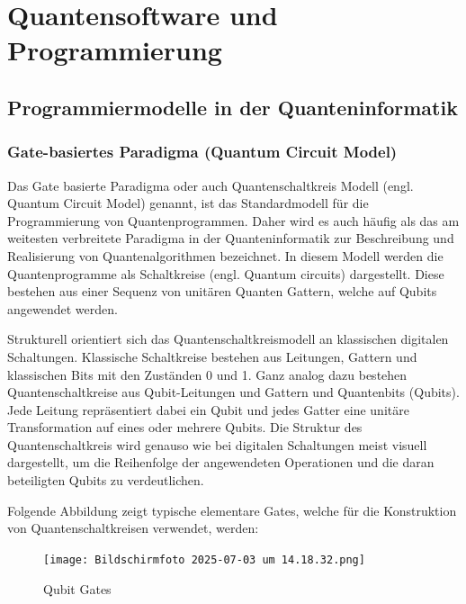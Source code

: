 \chapter{Quantensoftware und Programmierung}
\label{programming} %



\section{Programmiermodelle in der Quanteninformatik}

\subsection{Gate-basiertes Paradigma (Quantum Circuit Model)}
Das Gate basierte Paradigma oder auch Quantenschaltkreis Modell (engl. Quantum Circuit Model) genannt, ist das Standardmodell für die Programmierung von Quantenprogrammen. Daher wird es auch häufig als das am weitesten verbreitete Paradigma in der Quanteninformatik zur Beschreibung und Realisierung von Quantenalgorithmen bezeichnet. In diesem Modell werden die Quantenprogramme als Schaltkreise (engl. Quantum circuits) dargestellt. Diese bestehen aus einer Sequenz von unitären Quanten Gattern, welche auf Qubits angewendet werden. 

Strukturell orientiert sich das Quantenschaltkreismodell an klassischen digitalen Schaltungen. Klassische Schaltkreise bestehen aus Leitungen, Gattern und klassischen Bits mit den Zuständen 0 und 1. Ganz analog dazu bestehen Quantenschaltkreise aus Qubit-Leitungen und Gattern und Quantenbits (Qubits). Jede Leitung repräsentiert dabei ein Qubit und jedes Gatter eine unitäre Transformation auf eines oder mehrere Qubits. Die Struktur des Quantenschaltkreis wird genauso wie bei digitalen Schaltungen meist visuell dargestellt, um die Reihenfolge der angewendeten Operationen und die daran beteiligten Qubits zu verdeutlichen. 

Folgende Abbildung zeigt typische elementare Gates, welche für die Konstruktion von Quantenschaltkreisen verwendet, werden: 
\begin{figure}
    \centering
    \texttt{[image: Bildschirmfoto 2025-07-03 um 14.18.32.png]}
    \caption{Qubit Gates}
    \label{fig:enter-label}
\end{figure}

